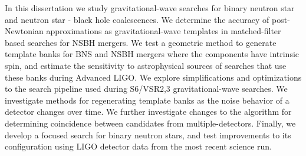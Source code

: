 
In this dissertation we study gravitational-wave searches for 
binary neutron star and neutron star - black hole coalescences. 
We determine the accuracy of post-Newtonian approximations as gravitational-wave
templates in matched-filter based searches for NSBH mergers.
We test a geometric method to generate template banks for BNS and NSBH mergers where
the components have intrinsic spin, and estimate the sensitivity to
astrophysical sources of searches that use these banks during Advanced LIGO.
We explore simplifications and optimizations to the search pipeline used 
during S6/VSR2,3 gravitational-wave searches. We investigate methods for regenerating
template banks as the noise behavior of a detector changes over time. We further
investigate changes to the algorithm for determining coincidence between
candidates from multiple-detectors.
Finally, we develop a focused search for binary neutron stars, and test improvements
to its configuration using LIGO detector data from the most recent science
run.
